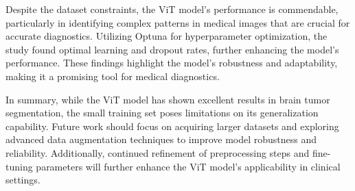 Despite the dataset constraints, the ViT model's performance is commendable, particularly in identifying complex patterns in medical images that are crucial for accurate diagnostics. Utilizing Optuna for hyperparameter optimization, the study found optimal learning and dropout rates, further enhancing the model's performance. These findings highlight the model's robustness and adaptability, making it a promising tool for medical diagnostics.

In summary, while the ViT model has shown excellent results in brain tumor segmentation, the small training set poses limitations on its generalization capability. Future work should focus on acquiring larger datasets and exploring advanced data augmentation techniques to improve model robustness and reliability. Additionally, continued refinement of preprocessing steps and fine-tuning parameters will further enhance the ViT model's applicability in clinical settings.

